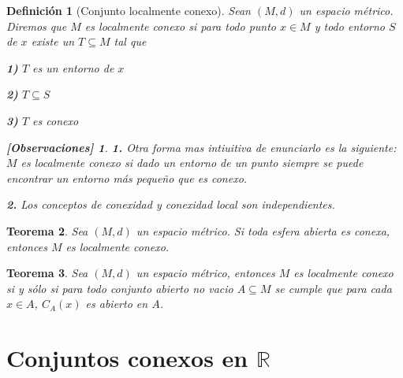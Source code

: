 \documentclass[oneside]{book} %
\theoremstyle{Teorema}
\newtheorem{Definicion}{Definición}[chapter]
\newtheorem{Teorema}[Definicion]{Teorema}
\theoremstyle{Ejemplos}
\theoremstyle{[Obs]}
\newtheorem*{Obs}{[Observaciones]}
\renewcommand{\{}{\left\lbrace} %
\renewcommand{\}}{\right\rbrace} %
\renewcommand{\sc}{\subseteq} %
\newcommand{\R}{\mathbb{R}} %
\begin{document}
			\begin{Definicion}[Conjunto localmente conexo]\setlength{\parindent}{0em}
			
				Sean $(M, d)$ un espacio métrico. Diremos que $M$ es localmente conexo si para todo punto $x \in M$ y todo entorno $S$ de $x$ existe un $T \sc M$ tal que 
				
				\textbf{1)} $T$ es un entorno de $x$
				
				\textbf{2)} $T \sc S$

				\textbf{3)} $T$ es conexo

				\begin{Obs}
				
					\textbf{1.} Otra forma mas intiuitiva de enunciarlo es la siguiente: $M$ es localmente conexo si dado un entorno de un punto siempre se puede encontrar un entorno más pequeño que es conexo.
					
					\textbf{2.} Los conceptos de conexidad y conexidad local son independientes.
				
				\end{Obs}
			
			\end{Definicion}

			\begin{Teorema}\setlength{\parindent}{0em}
			
				Sea $(M, d)$ un espacio métrico. Si toda esfera abierta es conexa, entonces $M$ es localmente conexo.
			
			\end{Teorema}

			\begin{Teorema}\setlength{\parindent}{0em}
			
				Sea $(M, d)$ un espacio métrico, entonces $M$ es localmente conexo si y sólo si para todo conjunto abierto no vacio $A \sc M$ se cumple que para cada $x \in A$, $C_{A}(x)$ es abierto en $A$.
			
			\end{Teorema}

		\section{Conjuntos conexos en $\R$}
\end{document}
